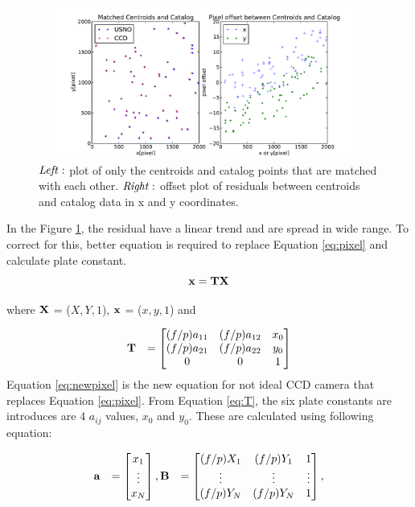 \documentclass[a4paper,12pt]{article}
\begin{document}
\begin{figure}[H]
	\centering
	\includegraphics[angle=0,height=5cm,width=11cm]{galaxy/offset.pdf}
	\caption{$\it{Left:}$ plot of only the centroids and catalog points that are matched with each other. $\it{Right:}$ offset plot of residuals between centroids and catalog data in x and y coordinates.}
	\label{fig:offset}
\end{figure}
In the Figure \ref{fig:offset}, the residual have a linear trend and are spread in wide range. To correct for this, better equation is required to replace Equation \ref{eq:pixel} and calculate plate constant. \\

\begin{equation}
\label{eq:newpixel}
	\bf{x}= \bf{TX}
\end{equation}

where $\bf{X}$ = ($X,Y,1$), $\bf{x}$ = ($x,y,1$) and 

\begin{equation}
\label{eq:T}
\begin{array}{rcl}
\bf{T}&= \begin{bmatrix}
      			(f/p)a_{11}&(f/p)a_{12}& x_0\\
      			(f/p)a_{21}&(f/p)a_{22}& y_0\\
      			0& 0 & 1
		\end{bmatrix}
\end{array}
\end{equation}
Equation \ref{eq:newpixel} is the new equation for not ideal CCD camera that replaces Equation \ref{eq:pixel}. From Equation \ref{eq:T}, the six plate constants are introduces are 4 $a_{ij}$ values, $x_0$ and $y_0$. These are calculated using following equation:

\begin{equation}
\label{eq:values}
\begin{array}{rcl}
\bf{a}&= \begin{bmatrix}
      			x_1\\
			\vdots\\
      			x_N
		\end{bmatrix},
\bf{B}&= \begin{bmatrix}
      			(f/p)X_{1}&(f/p)Y_{1}& 1\\
			\vdots&\vdots&\vdots\\
      			(f/p)Y_{N}&(f/p)Y_{N}& 1
		\end{bmatrix}, 
\end{array}
\end{equation}
 
\end{document}
